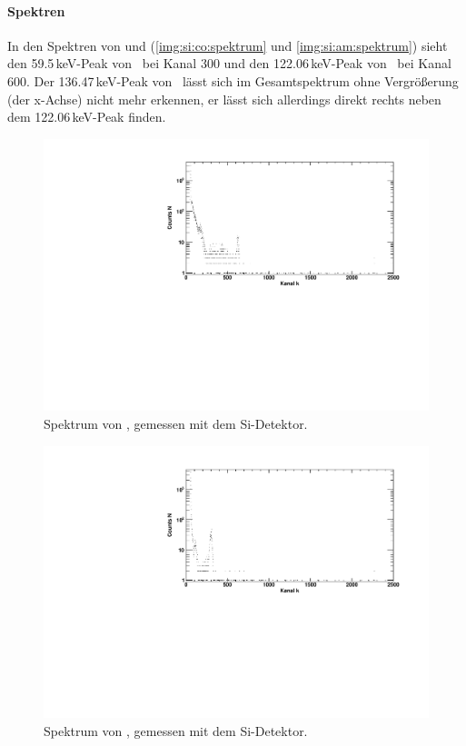 \paragraph{Spektren}
In den Spektren von \co und \am (\autoref{img:si:co:spektrum} und \autoref{img:si:am:spektrum}) sieht den 59.5\,keV-Peak 
von \am\, bei Kanal 300 und den 122.06\,keV-Peak von \co\, bei Kanal 600. Der 136.47\,keV-Peak von \co\, lässt sich im Gesamtspektrum 
ohne Vergrößerung (der x-Achse) nicht mehr erkennen, er lässt sich allerdings direkt rechts neben dem 122.06\,keV-Peak finden.
\begin{figure}[H]
\begin{center}
  \includegraphics[width=\textwidth]{../img/part3/Co-Si_spectrum.pdf}
  \caption{Spektrum von \co, gemessen mit dem Si-Detektor.}
  \label{img:si:co:spektrum}
\end{center}
\end{figure}

\begin{figure}[H]
\begin{center}
  \includegraphics[width=\textwidth]{../img/part3/Am-Si_spectrum.pdf}
  \caption{Spektrum von \am, gemessen mit dem Si-Detektor.}
  \label{img:si:am:spektrum}
\end{center}
\end{figure}

